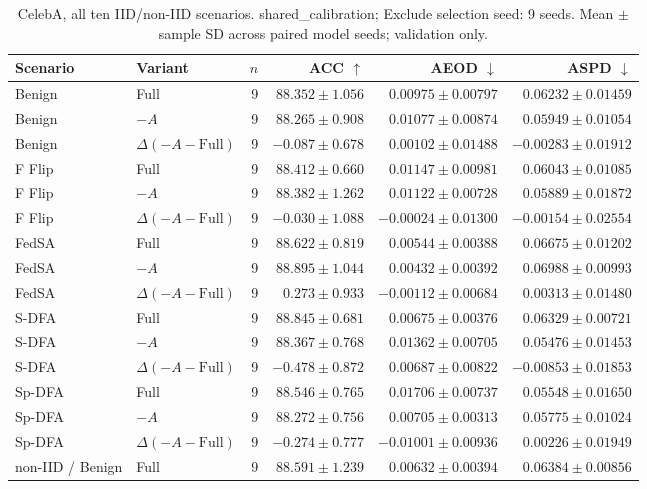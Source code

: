 \begin{table}[t]
\centering
\small
\caption{CelebA, all ten IID/non-IID scenarios. shared\_calibration; Exclude selection seed: 9 seeds. Mean $\pm$ sample SD across paired model seeds; validation only.}
\begin{tabular}{llrrrr}
\toprule
Scenario & Variant & $n$ & ACC $\uparrow$ & AEOD $\downarrow$ & ASPD $\downarrow$ \\
\midrule
Benign & Full & 9 & $88.352 \pm 1.056$ & $0.00975 \pm 0.00797$ & $0.06232 \pm 0.01459$ \\
Benign & $-A$ & 9 & $88.265 \pm 0.908$ & $0.01077 \pm 0.00874$ & $0.05949 \pm 0.01054$ \\
Benign & $\Delta(-A-\mathrm{Full})$ & 9 & $-0.087 \pm 0.678$ & $0.00102 \pm 0.01488$ & $-0.00283 \pm 0.01912$ \\
F Flip & Full & 9 & $88.412 \pm 0.660$ & $0.01147 \pm 0.00981$ & $0.06043 \pm 0.01085$ \\
F Flip & $-A$ & 9 & $88.382 \pm 1.262$ & $0.01122 \pm 0.00728$ & $0.05889 \pm 0.01872$ \\
F Flip & $\Delta(-A-\mathrm{Full})$ & 9 & $-0.030 \pm 1.088$ & $-0.00024 \pm 0.01300$ & $-0.00154 \pm 0.02554$ \\
FedSA & Full & 9 & $88.622 \pm 0.819$ & $0.00544 \pm 0.00388$ & $0.06675 \pm 0.01202$ \\
FedSA & $-A$ & 9 & $88.895 \pm 1.044$ & $0.00432 \pm 0.00392$ & $0.06988 \pm 0.00993$ \\
FedSA & $\Delta(-A-\mathrm{Full})$ & 9 & $0.273 \pm 0.933$ & $-0.00112 \pm 0.00684$ & $0.00313 \pm 0.01480$ \\
S-DFA & Full & 9 & $88.845 \pm 0.681$ & $0.00675 \pm 0.00376$ & $0.06329 \pm 0.00721$ \\
S-DFA & $-A$ & 9 & $88.367 \pm 0.768$ & $0.01362 \pm 0.00705$ & $0.05476 \pm 0.01453$ \\
S-DFA & $\Delta(-A-\mathrm{Full})$ & 9 & $-0.478 \pm 0.872$ & $0.00687 \pm 0.00822$ & $-0.00853 \pm 0.01853$ \\
Sp-DFA & Full & 9 & $88.546 \pm 0.765$ & $0.01706 \pm 0.00737$ & $0.05548 \pm 0.01650$ \\
Sp-DFA & $-A$ & 9 & $88.272 \pm 0.756$ & $0.00705 \pm 0.00313$ & $0.05775 \pm 0.01024$ \\
Sp-DFA & $\Delta(-A-\mathrm{Full})$ & 9 & $-0.274 \pm 0.777$ & $-0.01001 \pm 0.00936$ & $0.00226 \pm 0.01949$ \\
non-IID / Benign & Full & 9 & $88.591 \pm 1.239$ & $0.00632 \pm 0.00394$ & $0.06384 \pm 0.00856$ \\

\end{tabular}
\end{table}
